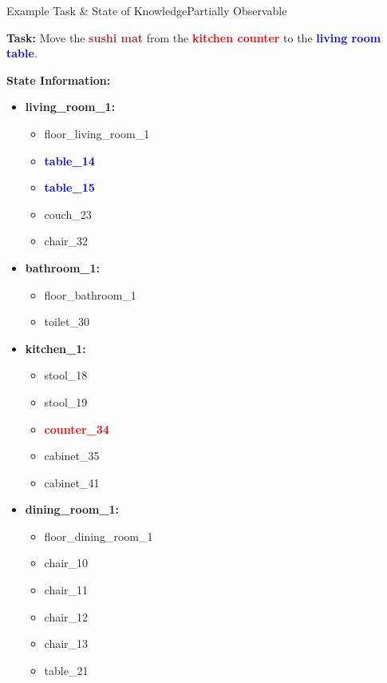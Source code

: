 \begin{Example}{Example Task \& State of Knowledge}{Partially Observable}

      \textbf{Task:} Move the \textbf{\textcolor{brown}{sushi mat}} from the \textbf{\textcolor{red}{kitchen counter}} to the  \textbf{\textcolor{blue}{living room table}}.

      \medskip
      \textbf{State Information:}
      \begin{itemize}
            \item \textbf{living\_room\_1:}
                  \begin{itemize}
                        \item floor\_living\_room\_1
                        \item \textbf{\textcolor{blue}{table\_14}}
                        \item \textbf{\textcolor{blue}{table\_15}}
                        \item couch\_23
                        \item chair\_32
                  \end{itemize}
            \item \textbf{bathroom\_1:}
                  \begin{itemize}
                        \item floor\_bathroom\_1
                        \item toilet\_30
                  \end{itemize}
            \item \textbf{kitchen\_1:}
                  \begin{itemize}
                        \item stool\_18
                        \item stool\_19
                        \item \textbf{\textcolor{red}{counter\_34}}
                        \item cabinet\_35
                        \item cabinet\_41
                  \end{itemize}
            \item \textbf{dining\_room\_1:}
                  \begin{itemize}
                        \item floor\_dining\_room\_1
                        \item chair\_10
                        \item chair\_11
                        \item chair\_12
                        \item chair\_13
                        \item table\_21
                  \end{itemize}
      \end{itemize}
      \medskip



\end{Example}\label{ex:example_task}

